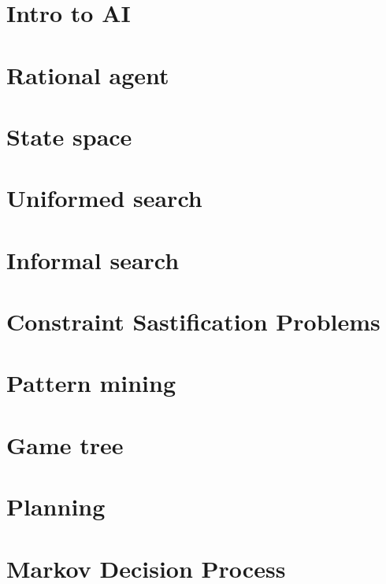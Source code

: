 \documentclass{article}
\begin{document}


\tableofcontents
\clearpage
{}
\setcounter{page}{1}

\section{Intro to AI}

\section{Rational agent}

\section{State space}

\section{Uniformed search}

\section{Informal search}

\section{Constraint Sastification Problems}

\section{Pattern mining}

\section{Game tree}

\section{Planning}

\section{Markov Decision Process}

\clearpage
\end{document}
